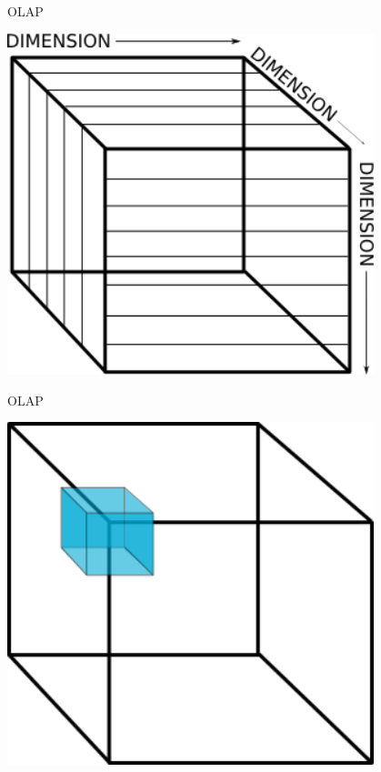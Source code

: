 \documentclass{beamer}
\begin{document}
\begin{frame}{OLAP}
    \begin{center}
        \includegraphics[width=0.8\textwidth]{cube-divided.png}
    \end{center}
\end{frame}

\begin{frame}{OLAP}
    \begin{center}
        \includegraphics[width=0.8\textwidth]{cube-selection.png}
    \end{center}
\end{frame}
\end{document}
